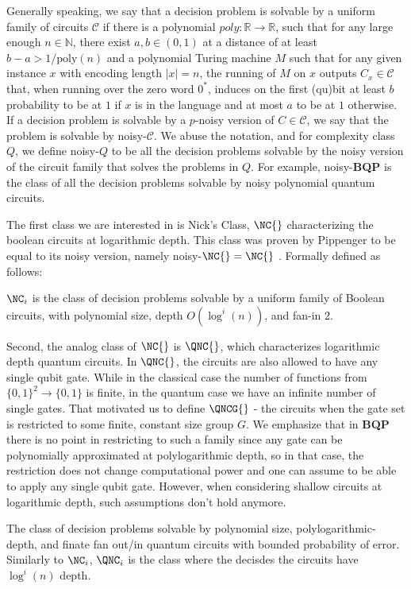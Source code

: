   
  Generally speaking, we say that a decision problem is solvable by a uniform family of circuits $\mathcal{C}$ if there is a polynomial $poly : \mathbb{R} \rightarrow \mathbb{R}$, such that for any large enough $n \in \mathbb{N}$, there exist $a, b \in (0,1)$ at a distance of at least $b - a > 1/\text{poly}(n)$ and a polynomial Turing machine $M$ such that for any given instance $x$ with encoding length $|x| = n$, the running of $M$ on $x$ outputs $C_x \in \mathcal{C}$ that, when running over the zero word $0^{*}$, induces on the first (qu)bit at least $b$ probability to be at $1$ if $x$ is in the language and at most $a$ to be at $1$ otherwise. 
If a decision problem is solvable by a $p$-noisy version of $C \in \mathcal{C}$, we say that the problem is solvable by noisy-$\mathcal{C}$. We abuse the notation, and for complexity class $Q$, we define noisy-$Q$ to be all the decision problems solvable by the noisy version of the circuit family that solves the problems in $Q$. For example, noisy-\textbf{BQP} is the class of all the decision problems solvable by noisy polynomial quantum circuits.  


The first class we are interested in is Nick's Class, $\NC{}$  characterizing the boolean circuits at logarithmic depth. This class was proven by Pippenger to be equal to its noisy version, namely noisy-$\NC{} = \NC{}$ \cite{Pippenger}. Formally defined as follows: 
\begin{definition}
$\NC_i$ is the class of decision problems solvable by a uniform family of Boolean circuits, with polynomial size, depth $O(\log^i(n))$, and fan-in $2$. 
\end{definition}


Second, the analog class of $\NC{}$ is $\QNC{}$, which characterizes logarithmic depth quantum circuits. In $\QNC{}$, the circuits are also allowed to have any single qubit gate. While in the classical case the number of functions from $\{0,1\}^{2} \rightarrow \{0,1\}$ is finite, in the quantum case we have an infinite number of single gates. That motivated us to define $\QNCG{}$ - the circuits when the gate set is restricted to some finite, constant size group $G$. We emphasize that in \textbf{BQP} there is no point in restricting to such a family since any gate can be polynomially approximated at polylogarithmic depth, so in that case, the restriction does not change computational power and one can assume to be able to apply any single qubit gate. However, when considering shallow circuits at logarithmic depth, such assumptions don't hold anymore.
\begin{definition}[$\QNC{}$]
  The class of decision problems solvable by polynomial size,  polylogarithmic-depth,  and finate fan out/in quantum circuits with bounded probability of error. Similarly to $\NC_i{}$, $\QNC_i{}$ is the class where the decisdes the circuits have $\log^i (n)$ depth.  
\end{definition}


